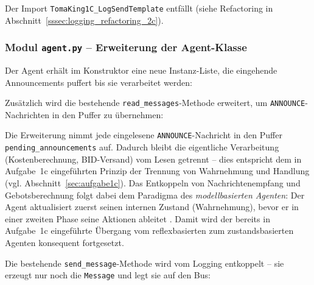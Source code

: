 Der Import \texttt{TomaKing1C\_LogSendTemplate} entfällt (siehe Refactoring in Abschnitt~\ref{sssec:logging_refactoring_2c}).


\subsubsection{Modul \texttt{agent.py} – Erweiterung der Agent-Klasse}

Der Agent erhält im Konstruktor eine neue Instanz-Liste, die eingehende Announcements puffert bis sie verarbeitet werden:



Zusätzlich wird die bestehende \texttt{read\_messages}-Methode erweitert, um \texttt{ANNOUNCE}-Nachrichten in den Puffer zu übernehmen:



Die Erweiterung nimmt jede eingelesene \texttt{ANNOUNCE}-Nachricht in den Puffer \\ \texttt{pending\_announcements} auf. Dadurch bleibt die eigentliche Verarbeitung (Kostenberechnung, BID-Versand) vom Lesen getrennt -- dies entspricht dem in Aufgabe~1c eingeführten Prinzip der Trennung von Wahrnehmung und Handlung (vgl. Abschnitt~\ref{sec:aufgabe1c}). Das Entkoppeln von Nachrichtenempfang und Gebotsberechnung folgt dabei dem Paradigma des \textit{modellbasierten Agenten}: Der Agent aktualisiert zuerst seinen internen Zustand (Wahrnehmung), bevor er in einer zweiten Phase seine Aktionen ableitet \cite[S. 18\,f.]{5}. Damit wird der bereits in Aufgabe~1c eingeführte Übergang vom reflexbasierten zum zustandsbasierten Agenten konsequent fortgesetzt.

Die bestehende \texttt{send\_message}-Methode wird vom Logging entkoppelt -- sie erzeugt nur noch die \texttt{Message} und legt sie auf den Bus:



